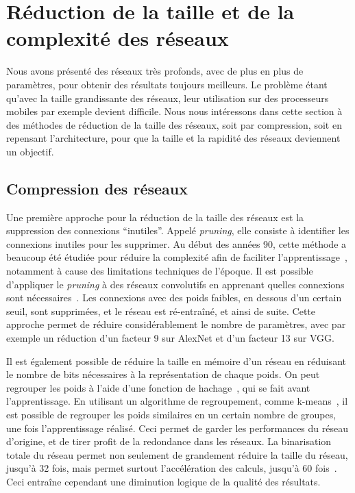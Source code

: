 \section{Réduction de la taille et de la complexité des réseaux}
\label{sec:petitsreseaux}

Nous avons présenté des réseaux très profonds, avec de plus en plus de paramètres, pour obtenir des résultats toujours meilleurs.
Le problème étant qu'avec la taille grandissante des réseaux, leur utilisation sur des processeurs mobiles par exemple devient difficile.
Nous nous intéressons dans cette section à des méthodes de réduction de la taille des réseaux, soit par compression, soit en repensant l'architecture, pour que la taille et la rapidité des réseaux deviennent un objectif.


\subsection{Compression des réseaux}
\label{sec:compression}

Une première approche pour la réduction de la taille des réseaux est la suppression des connexions ``inutiles''.
Appelé \textit{pruning}, elle consiste à identifier les connexions inutiles pour les supprimer.
Au début des années 90, cette méthode a beaucoup été étudiée pour réduire la complexité afin de faciliter l'apprentissage~\cite{lecun1989backpropagation, hanson1989comparing, hassibi1993second}, notamment à cause des limitations techniques de l’époque.
Il est possible d'appliquer le \textit{pruning} à des réseaux convolutifs en apprenant quelles connexions sont nécessaires~\cite{han2015learning, han2015deep}.
Les connexions avec des poids faibles, en dessous d'un certain seuil, sont supprimées, et le réseau est ré-entraîné, et ainsi de suite.
Cette approche permet de réduire considérablement le nombre de paramètres, avec par exemple un réduction d'un facteur 9 sur AlexNet et d'un facteur 13 sur VGG.

Il est également possible de réduire la taille en mémoire d'un réseau en réduisant le nombre de bits nécessaires à la représentation de chaque poids.
On peut regrouper les poids à l'aide d'une fonction de hachage~\cite{chen2015compressing}, qui se fait avant l'apprentissage.
En utilisant un algorithme de regroupement, comme k-means~\cite{lloyd1982least}, il est possible de regrouper les poids similaires en un certain nombre de groupes, une fois l'apprentissage réalisé.
Ceci permet de garder les performances du réseau d'origine, et de tirer profit de la redondance dans les réseaux.
La binarisation totale du réseau permet non seulement de grandement réduire la taille du réseau, jusqu'à 32 fois, mais permet surtout l'accélération des calculs, jusqu'à 60 fois~\cite{rastegari2016xnor}. 
Ceci entraîne cependant une diminution logique de la qualité des résultats.


